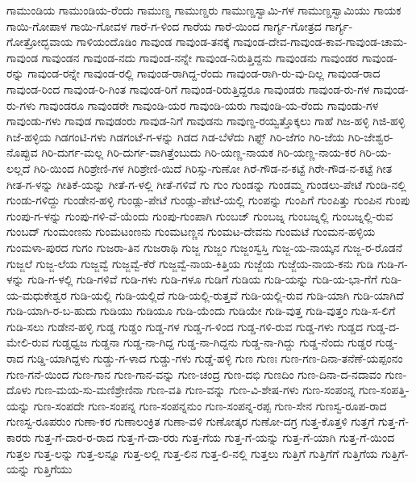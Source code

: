 ಗಾಮುಂಡಿಯ
ಗಾಮುಂಡಿಯ-ರೆಂದು
ಗಾಮುಣ್ಡ
ಗಾಮುಣ್ಡರು
ಗಾಮುಣ್ಡಸ್ವಾಮಿ-ಗಳ
ಗಾಮುಣ್ಡಸ್ವಾಮಿಯು
ಗಾಯಕ
ಗಾಯಿ-ಗೋಪಾಳ
ಗಾಯಿ-ಗೋವಳ
ಗಾರೆ-ಗ-ಳಿಂದ
ಗಾರೆಯ
ಗಾರೆ-ಯಿಂದ
ಗಾರ್ಗ್ಯ-ಗೋತ್ರದ
ಗಾರ್ಗ್ಯ-ಗೋತ್ರೋದ್ಭವಾಯ
ಗಾಳಿಯಂದೊಡಿಂ
ಗಾವುಂಡ
ಗಾವುಂಡ-ತನಕ್ಕೆ
ಗಾವುಂಡ-ದೇವ-ಗಾವುಂಡ-ಕಾವ-ಗಾವುಂಡ-ಚಾಮ-ಗಾವುಂಡ
ಗಾವುಂಡನ
ಗಾವುಂಡ-ನದು
ಗಾವುಂಡ-ನನ್ನೇ
ಗಾವುಂಡ-ನಿರುತ್ತಿದ್ದನು
ಗಾವುಂಡನು
ಗಾವುಂಡರ
ಗಾವುಂಡ-ರನ್ನು
ಗಾವುಂಡ-ರನ್ನೇ
ಗಾವುಂಡ-ರಲ್ಲಿ
ಗಾವುಂಡ-ರಾಗಿದ್ದ-ರೆಂದು
ಗಾವುಂಡ-ರಾಗಿ-ರು-ವು-ದಿಲ್ಲ
ಗಾವುಂಡ-ರಾದ
ಗಾವುಂಡ-ರಿಂದ
ಗಾವುಂಡ-ರಿ-ಗಿಂತ
ಗಾವುಂಡ-ರಿಗೆ
ಗಾವುಂಡ-ರಿರುತ್ತಿದ್ದರೂ
ಗಾವುಂಡರು
ಗಾವುಂಡ-ರು-ಗಳ
ಗಾವುಂಡ-ರು-ಗಳು
ಗಾವುಂಡರೂ
ಗಾವುಂಡರೇ
ಗಾವುಂಡಿ-ಯರ
ಗಾವುಂಡಿ-ಯರು
ಗಾವುಂಡಿ-ಯ-ರೆಂದು
ಗಾವುಂಡು-ಗಳ
ಗಾವುಂಡು-ಗಳು
ಗಾವುಡ
ಗಾವುಡಂರು
ಗಾವುಡ-ನಿಗೆ
ಗಾವುಡನು
ಗಾವುಣ್ಡ-ರಯ್ವತ್ತೊಕ್ಕಲು
ಗಾಹೆ
ಗಿಜ-ಹಳ್ಳಿ
ಗಿಜಿ-ಹಳ್ಳಿ
ಗಿಜೆ-ಹಳ್ಳಿಯ
ಗಿಡಗಂಟಿ-ಗಳು
ಗಿಡಗಂಟೆ-ಗ-ಳನ್ನು
ಗಿಡದ
ಗಿಡ-ಬೆಳೆದು
ಗಿಫ್ಟ್
ಗಿರಿ-ಜೆಗಂ
ಗಿರಿ-ಜೆಯ
ಗಿರಿ-ಜೇಶ್ವರ-ನೊಪ್ಪುವ
ಗಿರಿ-ದುರ್ಗ-ಮಲ್ಲ
ಗಿರಿ-ದುರ್ಗ-ವಾಗಿತ್ತೆಂಬುದು
ಗಿರಿ-ಯಣ್ಣ-ನಾಯಕ
ಗಿರಿ-ಯಣ್ಣ-ನಾಯ-ಕರ
ಗಿರಿ-ಯ-ಲಲ್ಲದೆ
ಗಿರಿ-ಯಿಂದ
ಗಿರಿಶ್ರೇಣಿ-ಗಳ
ಗಿರಿಶ್ರೇಣಿ-ಯಿದೆ
ಗಿರಿಸ್ಸು-ಗುಣೋ
ಗಿರೆ-ಗೌಡ-ನ-ಕಟ್ಟೆ
ಗಿರೇ-ಗೌಡ-ನ-ಕಟ್ಟೆ
ಗೀತ
ಗೀತ-ಗ-ಳನ್ನು
ಗೀತಿಕೆ-ಯನ್ನು
ಗೀತೆ-ಗ-ಳಲ್ಲಿ
ಗೀತೆ-ಗಳಿವೆ
ಗು
ಗುಂ
ಗುಂಡನ್ನು
ಗುಂಡಮ್ಮ
ಗುಂಡಲು-ಪೇಟೆ
ಗುಂಡಿ-ನಲ್ಲಿ
ಗುಂಡು-ಗಳಿದ್ದು
ಗುಂಡೇನ-ಹಳ್ಳಿ
ಗುಂಡ್ಲು-ಪೇಟೆ
ಗುಂಡ್ಲು-ಪೇಟೆ-ಯಲ್ಲಿ
ಗುಂಪನ್ನು
ಗುಂಪಿಗೆ
ಗುಂಪಿತ್ತು
ಗುಂಪಿನ
ಗುಂಪು
ಗುಂಪು-ಗ-ಳನ್ನು
ಗುಂಪು-ಗಳಿ-ವೆ-ಯೆಂದು
ಗುಂಪು-ಗುಂಪಾಗಿ
ಗುಂಬಜ್
ಗುಂಬಜ್ನ
ಗುಂಬಜ್ನಲ್ಲಿ
ಗುಂಬಜ್ನಲ್ಲಿ-ರುವ
ಗುಂಬದ್
ಗುಂಮಂಣನು
ಗುಂಮಟಂಣನು
ಗುಂಮಟಣ್ಣನ
ಗುಂಮಟ-ದೇವನು
ಗುಂಮಟೆ
ಗುಂಮನ-ಹಳ್ಳಿಯ
ಗುಂಮಳಾ-ಪುರದ
ಗುಗಂ
ಗುಜರಾ-ತಿನ
ಗುಜರಾಥಿ
ಗುಜ್ಜ
ಗುಜ್ಜಂ
ಗುಜ್ಜಂಸ್ವಸ್ತಿ
ಗುಜ್ಜ-ಯ-ನಾಯ್ಕನ
ಗುಜ್ಜ-ರ-ರೊಡನೆ
ಗುಜ್ಜಲೆ
ಗುಜ್ಜ-ಲೆಯ
ಗುಜ್ಜವ್ವೆ
ಗುಜ್ಜವ್ವೆ-ಕೆರೆ
ಗುಜ್ಜವ್ವೆ-ನಾಯ-ಕಿತ್ತಿಯ
ಗುಜ್ಜೆಯ
ಗುಜ್ಜೆಯ-ನಾಯ-ಕನು
ಗುಡಿ
ಗುಡಿ-ಗ-ಳನ್ನು
ಗುಡಿ-ಗ-ಳಲ್ಲಿ
ಗುಡಿ-ಗಳಿವೆ
ಗುಡಿ-ಗಳು
ಗುಡಿ-ಗಳೂ
ಗುಡಿಗೆ
ಗುಡಿಯ
ಗುಡಿ-ಯನ್ನು
ಗುಡಿ-ಯ-ಭಾ-ಗೆಗೆ
ಗುಡಿ-ಯ-ಮಧುಕೇಶ್ವರ
ಗುಡಿ-ಯಲ್ಲಿ
ಗುಡಿ-ಯಲ್ಲಿದೆ
ಗುಡಿ-ಯಲ್ಲಿ-ರುತ್ತವೆ
ಗುಡಿ-ಯಲ್ಲಿ-ರುವ
ಗುಡಿ-ಯಾಗಿ
ಗುಡಿ-ಯಾಗಿದೆ
ಗುಡಿ-ಯಾಗಿ-ರ-ಬ-ಹುದು
ಗುಡಿಯು
ಗುಡಿಯೂ
ಗುಡಿ-ಯೆಂದು
ಗುಡಿಯೇ
ಗುಡಿ-ವುತ್ತ
ಗುಡಿ-ವುತ್ತಂ
ಗುಡಿ-ಸ-ಲಿಗೆ
ಗುಡಿ-ಸಲು
ಗುಡೇನ-ಹಳ್ಳಿ
ಗುಡ್ಡ
ಗುಡ್ಡಂ
ಗುಡ್ಡ-ಗಳ
ಗುಡ್ಡ-ಗ-ಳಿಂದ
ಗುಡ್ಡ-ಗಳಿ-ರುವ
ಗುಡ್ಡ-ಗಳು
ಗುಡ್ಡದ
ಗುಡ್ಡ-ದ-ಮೇಲಿ-ರುವ
ಗುಡ್ಡಧ್ವಜ
ಗುಡ್ಡನಾ
ಗುಡ್ಡ-ನಾ-ಗಿದ್ದ
ಗುಡ್ಡ-ನಾ-ಗಿದ್ದನು
ಗುಡ್ಡ-ನಾ-ಗಿದ್ದು
ಗುಡ್ಡ-ನೆಂದು
ಗುಡ್ಡರ
ಗುಡ್ಡ-ರಾದ
ಗುಡ್ಡಿ-ಯಾಗಿದ್ದಳು
ಗುಡ್ಡು-ಗ-ಳಾದ
ಗುಡ್ಡು-ಗಳು
ಗುಡ್ಡೆ-ಹಳ್ಳಿ
ಗುಣ
ಗುಣಃ
ಗುಣ-ಗಣ-ದಿನಾ-ತನೆಣೆ-ಯಪ್ಪಂನಂ
ಗುಣ-ಗನೆ-ಯಿಂದ
ಗುಣ-ಗಾನ
ಗುಣ-ಗಾನ-ವನ್ನು
ಗುಣ-ಚಂದ್ರ
ಗುಣ-ದಭಿ
ಗುಣದಿಂ
ಗುಣ-ದಿನಾ-ದ-ನದಾವಂ
ಗುಣ-ದೊಳು
ಗುಣ-ಮಯ-ಸು-ಮಣಿಶ್ರೇಣಿನಾ
ಗುಣ-ವತಿ
ಗುಣ-ವನ್ನು
ಗುಣ-ವಿ-ಶೇಷ-ಗಳು
ಗುಣ-ಸಂಪಂನ್ನ
ಗುಣ-ಸಂಪತ್ತಿ-ಯನ್ನು
ಗುಣ-ಸಂಪದೇ
ಗುಣ-ಸಂಪನ್ನ
ಗುಣ-ಸಂಪನ್ನನುಂ
ಗುಣ-ಸಂಪನ್ನ-ರಪ್ಪ
ಗುಣ-ಸೇನ
ಗುಣಸ್ವ-ರೂಪ-ರಾದ
ಗುಣಸ್ವ-ರೂಪರುಂ
ಗುಣಾ-ಕರ
ಗುಣಾಲಂಕ್ರಿತ
ಗುಣಾ-ವಳಿ
ಗುಣೋತ್ಕರ
ಗುಣೋ-ದಗ್ರ
ಗುತ್ತ-ಕೊತ್ತಳಿ
ಗುತ್ತಗೆ
ಗುತ್ತ-ಗೆ-ಕಾರರು
ಗುತ್ತ-ಗೆ-ದಾರ-ರ-ರಾದ
ಗುತ್ತ-ಗೆ-ದಾ-ರರು
ಗುತ್ತ-ಗೆಯ
ಗುತ್ತ-ಗೆ-ಯನ್ನು
ಗುತ್ತ-ಗೆ-ಯಾಗಿ
ಗುತ್ತ-ಗೆ-ಯಿಂದ
ಗುತ್ತಲ
ಗುತ್ತ-ಲನ್ನು
ಗುತ್ತ-ಲನ್ನೂ
ಗುತ್ತ-ಲಲ್ಲಿ
ಗುತ್ತ-ಲಿನ
ಗುತ್ತ-ಲಿ-ನಲ್ಲಿ
ಗುತ್ತಲು
ಗುತ್ತಿಗೆ
ಗುತ್ತಿಗೆಗೆ
ಗುತ್ತಿಗೆಯ
ಗುತ್ತಿಗೆ-ಯನ್ನು
ಗುತ್ತಿಗೆಯು
